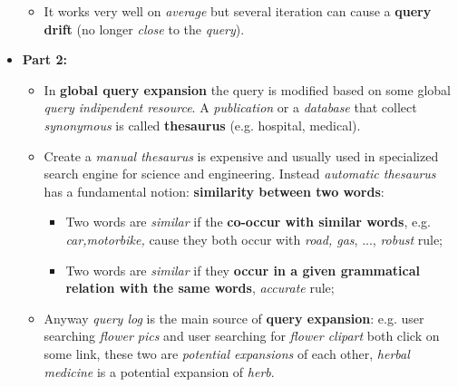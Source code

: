\documentclass{article}
\begin{document}
\begin{itemize}
\begin{itemize}
\begin{itemize}
\end{itemize}
\item It works very well on \emph{average} but several iteration can cause a \textbf{query drift} (no longer \emph{close} to the \emph{query}).
\end{itemize}
\item \textbf{Part 2:}
\begin{itemize}
\item In \textbf{global query expansion} the query is modified based on some global \emph{query indipendent resource}. A \emph{publication} or a \emph{database} that collect \emph{synonymous} is called \textbf{thesaurus} (e.g. hospital, medical). 
\item Create a \emph{manual thesaurus} is expensive and usually used in specialized search engine for science and engineering. Instead \emph{automatic thesaurus} has a fundamental notion: \textbf{similarity between two words}:
\begin{itemize}
\item Two words are \emph{similar} if the \textbf{co-occur with similar words}, e.g. \emph{car,motorbike,} cause they both occur with \emph{road, gas}, ..., \emph{robust} rule;
\item Two words are \emph{similar} if they \textbf{occur in a given grammatical relation with the same words}, \emph{accurate} rule;
\end{itemize}
\item Anyway \emph{query log} is the main source of \textbf{query expansion}: e.g. user searching \emph{flower pics} and user searching for \emph{flower clipart} both click on some link, these two are \emph{potential expansions} of each other, \emph{herbal medicine} is a potential expansion of \emph{herb}.
\end{itemize}
\end{itemize}
\end{document}
